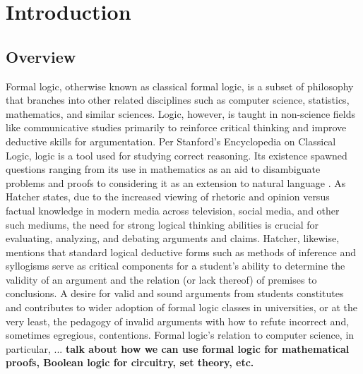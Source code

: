 \documentclass[ms]{uncgdissertationexp2}
\theoremstyle{plain}
\theoremstyle{definition}
\theoremstyle{remark}
\begin{document}
\tableofcontents 




\listoffigures   


\mainmatter %
\chapter{Introduction}
    \section{Overview}
    Formal logic, otherwise known as classical formal logic, is a subset of philosophy that branches into other related disciplines such as computer science, statistics, mathematics, and similar sciences. Logic, however, is taught in non-science fields like communicative studies primarily to reinforce critical thinking and improve deductive skills for argumentation. Per Stanford's Encyclopedia on Classical Logic, logic is a tool used for studying correct reasoning. Its existence spawned questions ranging from its use in mathematics as an aid to disambiguate problems and proofs to considering it as an extension to natural language \cite{stanfordencyclopedia}. As Hatcher \cite{hatcher} states, due to the increased viewing of rhetoric and opinion versus factual knowledge in modern media across television, social media, and other such mediums, the need for strong logical thinking abilities is crucial for evaluating, analyzing, and debating arguments and claims. Hatcher, likewise, mentions that standard logical deductive forms such as methods of inference and syllogisms serve as critical components for a student's ability to determine the validity of an argument and the relation (or lack thereof) of premises to conclusions. A desire for valid and sound arguments from students constitutes and contributes to wider adoption of formal logic classes in universities, or at the very least, the pedagogy of invalid arguments with how to refute incorrect and, sometimes egregious, contentions.  Formal logic's relation to computer science, in particular, ... \textbf{talk about how we can use formal logic for mathematical proofs, Boolean logic for circuitry, set theory, etc.}
\end{document}
